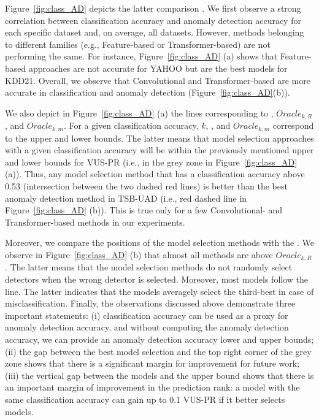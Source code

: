 Figure~\ref{fig:class_AD} depicts the latter comparison . We first observe a strong correlation between classification accuracy and anomaly detection accuracy for each specific dataset and, on average, all datasets. However, methods belonging to different families (e.g., Feature-based or Transformer-based) are not performing the same. For instance, Figure~\ref{fig:class_AD} (a) shows that Feature-based approaches are not accurate for YAHOO but are the best models for KDD21. Overall, we observe that Convolutional and Transformer-based are more accurate in classification and anomaly detection (Figure~\ref{fig:class_AD}(b)). 



We also depict in Figure~\ref{fig:class_AD} (a) the lines corresponding to , $Oracle_{k,R}$, and $Oracle_{k,m}$. For a given classification accuracy, $k$, , and $Oracle_{k,m}$ correspond to the upper and lower bounds. The latter means that model selection approaches with a given classification accuracy will be within the previously mentioned upper and lower bounds for VUS-PR (i.e., in the grey zone in Figure~\ref{fig:class_AD} (a)). 
Thus, any model selection method that has a classification accuracy above 0.53 (intersection between the two dashed red lines) is better than the  best anomaly detection method in TSB-UAD (i.e., red dashed line in Figure~\ref{fig:class_AD} (b)). 
This is true only for a few Convolutional- and Transformer-based methods in our experiments.

Moreover, we compare the positions of the model selection methods with  the . We observe in Figure~\ref{fig:class_AD} (b) that almost all methods are above $Oracle_{k,R}$. The latter means that the model selection methods do not randomly select detectors when the wrong detector is selected. Moreover, most models follow the  line. The latter indicates that the models averagely select the third-best in case of misclassification. Finally, the observations discussed above demonstrate three important statements: (i) classification accuracy can be used as a proxy for anomaly detection accuracy, and without computing the anomaly detection accuracy, we can provide an anomaly detection accuracy lower and upper bounds; (ii) the gap between the best model selection and the top right corner of the grey zone shows that there is a significant margin for improvement for future work; (iii) the vertical gap between the models and the upper bound  shows that there is an important margin of improvement in the prediction rank: a model with the same classification accuracy can gain up to $0.1$ VUS-PR if it better selects models.


